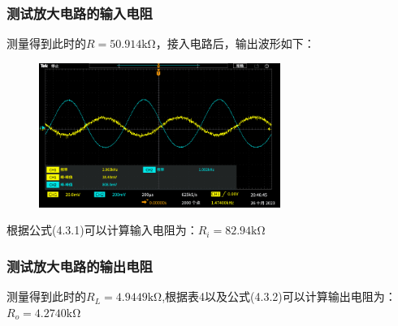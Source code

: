 \documentclass[a4paper,11pt,UTF8]{article}
\numberwithin{equation}{subsection}
\begin{document}
\subsubsection{测试放大电路的输入电阻}
测量得到此时的$R=50.914\mathrm{k\Omega}$，接入电路后，输出波形如下：
\begin{figure}[H]
	\centering
	\includegraphics[width=0.7\textwidth]{TEK00009.PNG}
\end{figure}

根据公式(4.3.1)可以计算输入电阻为：$R_i=82.94\mathrm{k\Omega}$
\subsubsection{测试放大电路的输出电阻}
测量得到此时的$R_L=4.9449\mathrm{k\Omega}$,根据表4以及公式(4.3.2)可以计算输出电阻为：$R_o=4.2740\mathrm{k\Omega}$
\end{document}
